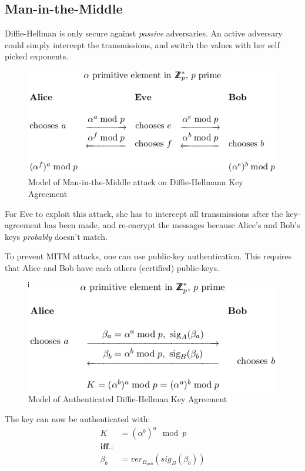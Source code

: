 \subsection{Man-in-the-Middle}
Diffie-Hellman is only secure against \emph{passive} adversaries. An
active adversary could simply intercept the transmissions, and switch
the values with her self picked exponents.
\begin{figure}[H]
  \begin{centering}
    \includegraphics[width=12cm]{images/11-diffie-mitm}
    \caption{Model of Man-in-the-Middle attack on Diffie-Hellmann Key Agreement}
  \end{centering}
  \label{fig:diffie-mitm}
\end{figure}
For Eve to exploit this attack, she has to intercept all transmissions
after the key-agreement has been made, and re-encrypt the messages
because Alice's and Bob's keys \emph{probably} doesn't match.

To prevent MITM attacks, one can use public-key authentication. This
requires that Alice and Bob have each others (certified) public-keys.
\begin{figure}[H]
  \begin{centering}
    \includegraphics[width=12cm]{images/11-auth-diffie}
    \caption{Model of Authenticated Diffie-Hellman Key Agreement}
  \end{centering}
  \label{fig:auth-diffie}
\end{figure}

The key can now be authenticated with:
\begin{align*}
  K &= (\alpha^b)^a \mod p \\
  \textbf{iff.:}& \\
  \beta_b &= ver_{B_{pub}}(sig_B(\beta_b))
\end{align*}